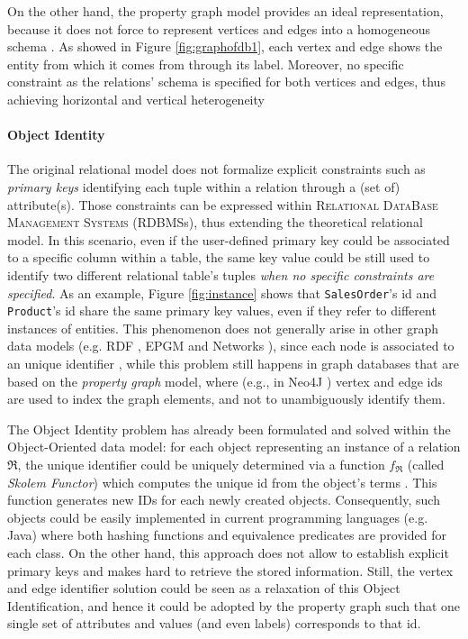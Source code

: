 On the other hand, the property graph model provides an ideal representation, because it does not force to represent vertices and edges into a homogeneous schema \cite{Vasilyeva13}. As showed in Figure \ref{fig:graphofdb1}, each vertex and edge shows the entity from which it comes from through its label. Moreover, no specific constraint as the relations' schema is specified for both vertices and edges, thus achieving horizontal and vertical heterogeneity

\paragraph*{Object Identity}\label{sec:objid}
The original relational model does not formalize explicit constraints such as \textit{primary keys} identifying each tuple within a relation through a (set of) attribute(s). Those constraints can be expressed within \textsc{Relational DataBase Management Systems} (RDBMSs), thus extending the theoretical relational model. In this scenario, even if the user-defined primary key could be associated to a specific column within a table, the same key value could be still used to identify two different relational table's tuples \textit{when no specific constraints are specified}. As an example, Figure \ref{fig:instance} shows that \texttt{SalesOrder}'s id and \texttt{Product}'s id share the same primary key values, even if they refer to different instances of entities. This phenomenon does not generally arise in other graph data models (e.g. RDF \cite{Allemang2011}, EPGM \cite{apacheflink}
and Networks \cite{Johnson2011}), since each node is associated to an unique identifier \cite{GutierrezInclusion}, while this problem still
happens in graph databases that are based on the \textit{property graph} model, where (e.g., in Neo4J \cite{Neo4jAlg}) vertex and edge ids are used to index the graph elements, and not to unambiguously identify them. 

The Object Identity problem has already been formulated and solved within the Object-Oriented data model: for each object
representing an instance of a relation $\Re$, the unique identifier could be uniquely determined via a function $f_\Re$ 
(called \textit{Skolem Functor}\label{skolem}) which computes the unique id from the object's terms \cite{Cabibbo}. This function
generates new IDs for each newly created objects. Consequently, such objects could be easily implemented
in current programming languages (e.g. Java) where both hashing functions and equivalence predicates are provided for
each class. On the other hand, this approach does not allow to establish explicit primary keys and makes hard to retrieve the stored information. Still, the vertex and edge identifier solution could be seen as a relaxation of this Object Identification, and hence it could be adopted by the property graph such that one single set of attributes and values (and even labels) corresponds to that id.


